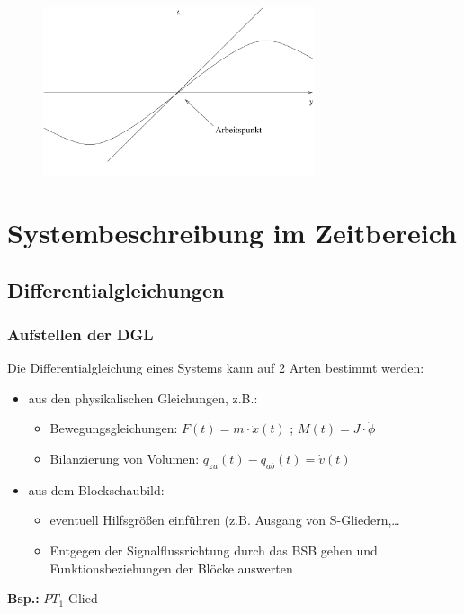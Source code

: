 \documentclass[12pt,a4paper,ngerman]{scrartcl}
\begin{document}
\begin{figure}[H]
\center
\includegraphics[width=8cm]{sysregel_linear}
\end{figure}

\section{Systembeschreibung im Zeitbereich}

\subsection{Differentialgleichungen}

\subsubsection{Aufstellen der DGL}

Die Differentialgleichung eines Systems kann auf 2 Arten bestimmt werden:
\begin{itemize}
\item aus den physikalischen Gleichungen, z.B.:
  \begin{itemize}
  \item Bewegungsgleichungen: $F(t)=m \cdot \ddot{x}(t)$ ; $M(t)=J \cdot \ddot{\phi}$
  \item Bilanzierung von Volumen: $q_{zu}(t)-q_{ab}(t)=\dot{v}(t)$ 
  \end{itemize}
\item aus dem Blockschaubild:
  \begin{itemize}
  \item eventuell Hilfsgrößen einführen (z.B. Ausgang von S-Gliedern,\dots
  \item Entgegen der Signalflussrichtung durch das BSB gehen und Funktionsbeziehungen der Blöcke auswerten
   \end{itemize}
\end{itemize}
\textbf{Bsp.:} $PT_1$-Glied
\end{document}
